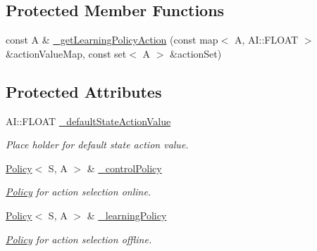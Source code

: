 \subsection*{Protected Member Functions}
\begin{DoxyCompactItemize}
\item 
const A \& \hyperlink{classAI_1_1Algorithm_1_1LearningAlgorithm_ad5b5f6baa9c03f68427008abeeb35535}{\-\_\-get\-Learning\-Policy\-Action} (const map$<$ A, A\-I\-::\-F\-L\-O\-A\-T $>$ \&action\-Value\-Map, const set$<$ A $>$ \&action\-Set)
\end{DoxyCompactItemize}
\subsection*{Protected Attributes}
\begin{DoxyCompactItemize}
\item 
\hypertarget{classAI_1_1Algorithm_1_1LearningAlgorithm_ae3b8ccdc51ad2a8c1cc2ef9009258466}{A\-I\-::\-F\-L\-O\-A\-T \hyperlink{classAI_1_1Algorithm_1_1LearningAlgorithm_ae3b8ccdc51ad2a8c1cc2ef9009258466}{\-\_\-default\-State\-Action\-Value}}\label{classAI_1_1Algorithm_1_1LearningAlgorithm_ae3b8ccdc51ad2a8c1cc2ef9009258466}

\begin{DoxyCompactList}\small\item\em Place holder for default state action value. \end{DoxyCompactList}\item 
\hypertarget{classAI_1_1Algorithm_1_1LearningAlgorithm_a5215770356f6411a2bacc51de60dbe6a}{\hyperlink{classAI_1_1Algorithm_1_1Policy}{Policy}$<$ S, A $>$ \& \hyperlink{classAI_1_1Algorithm_1_1LearningAlgorithm_a5215770356f6411a2bacc51de60dbe6a}{\-\_\-control\-Policy}}\label{classAI_1_1Algorithm_1_1LearningAlgorithm_a5215770356f6411a2bacc51de60dbe6a}

\begin{DoxyCompactList}\small\item\em \hyperlink{classAI_1_1Algorithm_1_1Policy}{Policy} for action selection online. \end{DoxyCompactList}\item 
\hypertarget{classAI_1_1Algorithm_1_1LearningAlgorithm_a1783770f6b4e96d69cd51a4d5ea1bb0d}{\hyperlink{classAI_1_1Algorithm_1_1Policy}{Policy}$<$ S, A $>$ \& \hyperlink{classAI_1_1Algorithm_1_1LearningAlgorithm_a1783770f6b4e96d69cd51a4d5ea1bb0d}{\-\_\-learning\-Policy}}\label{classAI_1_1Algorithm_1_1LearningAlgorithm_a1783770f6b4e96d69cd51a4d5ea1bb0d}

\begin{DoxyCompactList}\small\item\em \hyperlink{classAI_1_1Algorithm_1_1Policy}{Policy} for action selection offline. \end{DoxyCompactList}\end{DoxyCompactItemize}
